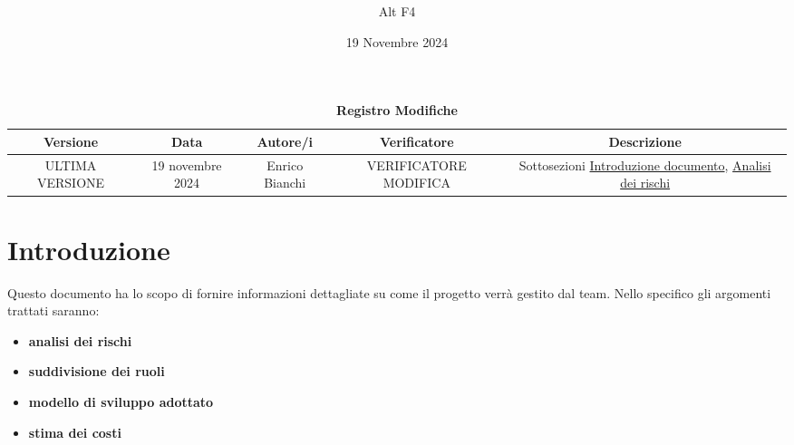 \documentclass[a4paper, 12pt]{article}
\title{\Huge \textbf{\titolo}}
\author{\Large{Alt} \raisebox{0.3ex}{\normalsize  +} \Large{F4}}
\date{19 Novembre 2024}
\def\logo{../Immagini/logo.jpeg}
\begin{document}
\begin{titlepage}      
    \maketitle
    \thispagestyle{empty}  

\end{titlepage}

\thispagestyle{plain}
\begin{table}[!h]
    \centering
    \caption*{\textbf{\Large Registro Modifiche}}
    {\renewcommand{\arraystretch}{2}
    \begin{tabularx}{\textwidth}{| c | c | C | C | C |}
        \hline
            \textbf{\normalsize Versione} & 
            \textbf{\normalsize Data} & 
            \textbf{\normalsize Autore/i} & 
            \textbf{\normalsize Verificatore} &
            \textbf{\normalsize Descrizione} \\ 
        \hline \hline
        ULTIMA VERSIONE & 
        19 novembre 2024  & 
        Enrico Bianchi &
        VERIFICATORE MODIFICA& 
        Sottosezioni \hyperref[sec:intro]{Introduzione documento}, \hyperref[sec:adr]{Analisi dei rischi} \\
        \hline 
    \end{tabularx}}
\end{table}
\restoregeometry

\tableofcontents

\newpage

\section{Introduzione}
\label{sec:intro}
Questo documento ha lo scopo di fornire informazioni dettagliate su come il progetto verrà gestito dal team.
Nello specifico gli argomenti trattati saranno:
\begin{itemize}
    \item \textbf{analisi dei rischi}
    \item \textbf{suddivisione dei ruoli}
    \item \textbf{modello di sviluppo adottato}
    \item \textbf{stima dei costi}
\end{itemize}
\end{document}
